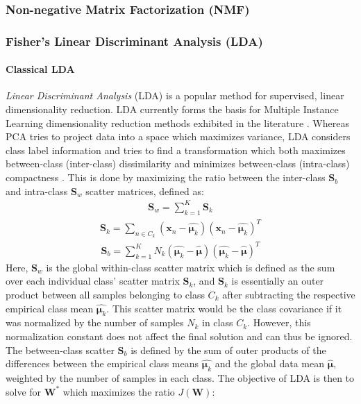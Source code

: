 \subsubsection{Non-negative Matrix Factorization (NMF)}

\subsubsection{Fisher's Linear Discriminant Analysis (LDA)}

\paragraph{Classical LDA}
\textit{Linear Discriminant Analysis} (LDA) is a popular method for supervised, linear dimensionality reduction.  LDA currently forms the basis for Multiple Instance Learning dimensionality reduction methods exhibited in the literature \citep{Sun2010MIDR,Chai2014MIDA,Zhu2018MIDRSparsity,Xu2011MI_Metric_Learning}. Whereas PCA tries to project data into a space which maximizes variance, LDA considers class label information and tries to find a transformation which both maximizes between-class (inter-class) dissimilarity and minimizes between-class (intra-class) compactness \citep{Yan2007GeneralGraphEmbeddingFramework,Chao2019RecentAdvancesSupervisedDimRed, Sun2010MIDR, Murphy2012}.   This is done by maximizing the ratio between the inter-class $\bm{S}_{b}$ and intra-class $\bm{S}_{w}$ scatter matrices, defined as:
\begin{align}
	\bm{S}_{w} = \sum_{k=1}^{K}\bm{S}_{k}
\end{align}
\begin{align}
	\bm{S}_{k} = \sum_{n \in C_{k}}(\bm{x}_{n} - \hat{\bm{\mu}_{k}})(\bm{x}_{n} - \hat{\bm{\mu}_{k}})^{T}
\end{align}
\begin{align}
	\bm{S}_{b} = \sum_{k=1}^{K}N_{k}(\hat{\bm{\mu}_{k}} - \hat{\bm{\mu}})(\hat{\bm{\mu}_{k}} - \hat{\bm{\mu}})^{T}
\end{align}
\noindent
Here, $\bm{S}_{w}$ is the global within-class scatter matrix which is defined as the sum over each individual class' scatter matrix $\bm{S}_{k}$, and $\bm{S}_{k}$ is essentially an outer product between all samples belonging to class $C_{k}$ after subtracting the respective empirical class mean $\hat{\bm{\mu}_{k}}$.  This scatter matrix would be the class covariance if it was normalized by the number of samples $N_{k}$ in class $C_{k}$.  However, this normalization constant does not affect the final solution and can thus be ignored.  The between-class scatter $\bm{S}_{b}$ is defined by the sum of outer products of the differences between the empirical class means $\hat{\bm{\mu}_{k}}$ and the global data mean $\hat{\bm{\mu}}$, weighted by the number of samples in each class.  The objective of LDA is then to solve for $\bm{W}^{*}$ which maximizes the ratio $J(\bm{W})$:
